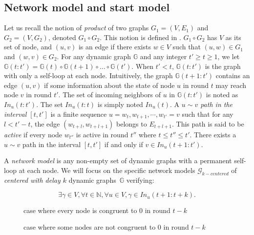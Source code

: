 \documentclass[11pt,letterpaper]{article}
\newcommand{\cent}{\gamma}
\begin{document}
\subsection{Network model and start model}

Let us recall the notion of \textit{product} of two graphs $G_1 = (V, E_1)$ and $G_2 = (V, G_2)$, denoted $G_1 \circ G_2$. This notion is defined in \cite{CBM19}.
$G_1 \circ G_2$ has $V$ as its set of node, and $(u,v)$ is an edge if there exists $w \in V$ such that $(u,w) \in G_1$ and $(w,v) \in G_2$.
For any dynamic graph $\mathds{G}$ and any integer $t' \geq t \geq 1$, we let $\mathds{G}(t:t') = \mathds{G}(t) \circ \mathds{G}(t+1) \circ \dots \circ \mathds{G}(t')$.
When $t' < t$, $\mathds{G}(t:t')$ is the graph with only a self-loop at each node.
Intuitively, the graph $\mathds{G}(t+1:t')$ contains an edge $(u,v)$ if some information about the state of node $u$ in round $t$ may reach node $v$ in round $t'$.
The set of incoming neighbors of $u$ in $\mathds{G}(t:t')$ is noted as $In_u(t:t')$.
The set $In_u(t:t)$ is simply noted $In_u(t)$.
A \textit{$u \sim v$ path in the interval $[t,t']$} is a finite sequence $u = w_{t}, w_{t+1}, \cdots, w_{t'} = v$
such that for any $l < t'-t$, the edge $(w_{t+l},w_{t+l+1})$ belongs to $E_{t+l+1}$.
This path is said to be \textit{active} if every node $w_{t''}$ is active in round $t''$ where $t \leq t'' \leq t'$.
There exists a $u \sim v$ path in the interval $[t,t']$ if and only if $v \in In_u(t+1:t')$.

A \emph{network model} is any non-empty set of dynamic graphs with a permanent self-loop at each node.
We will focus on the specific network models $\mathcal{G}_{k-centered}$ of \emph{centered with delay $k$} dynamic graphs~$\mathds{G}$ verifying: 

$$\exists \cent \in V, \forall t \in \mathds{N}, \forall u \in V, \cent \in In_u(t+1:t+k).$$

\begin{figure}[h]
    \centering
    \def\svgwidth{0.7\columnwidth}
	
	\caption{case where every node is congruent to 0 in round $t-k$}
	\label{fig:fig1}
\end{figure}

\begin{figure}[h]
    \centering
    \def\svgwidth{0.7\columnwidth}
	
	\caption{case where some nodes are not congruent to 0 in round $t-k$}
	\label{fig:fig2}
\end{figure}
\end{document}
